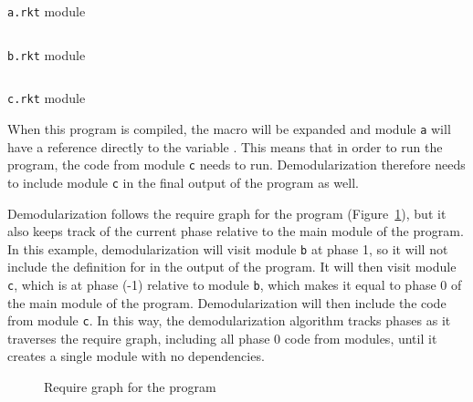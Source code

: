 \begin{listing}[tb]
  \inputminted{racket}{listings/a.rkt}
  \caption{\texttt{a.rkt} module}
  \label{lst:a.rkt}
\end{listing}

\begin{listing}[tb]
  \inputminted{racket}{listings/b.rkt}
  \caption{\texttt{b.rkt} module}
  \label{lst:b.rkt}
\end{listing}

\begin{listing}[tb]
  \inputminted{racket}{listings/c.rkt}
  \caption{\texttt{c.rkt} module}
  \label{lst:c.rkt}
\end{listing}

When this program is compiled, the macro will be expanded and module \texttt{a} will have a reference directly to the variable . 
This means that in order to run the program, the code from module \texttt{c} needs to run.
Demodularization therefore needs to include module \texttt{c} in the final output of the program as well.

Demodularization follows the require graph for the program (Figure~\ref{fig:d-modules.tex}), but it also keeps track of the current phase relative to the main module of the program.
In this example, demodularization will visit module \texttt{b} at phase 1, so it will not include the definition for  in the output of the program.
It will then visit module \texttt{c}, which is at phase (-1) relative to module \texttt{b}, which makes it equal to phase 0 of the main module of the program.
Demodularization will then include the code from module \texttt{c}.
In this way, the demodularization algorithm tracks phases as it traverses the require graph, including all phase 0 code from modules, until it creates a single module with no dependencies.

\begin{figure}[tb]
  
  \caption{Require graph for the  program}
  \label{fig:d-modules.tex}
\end{figure}


